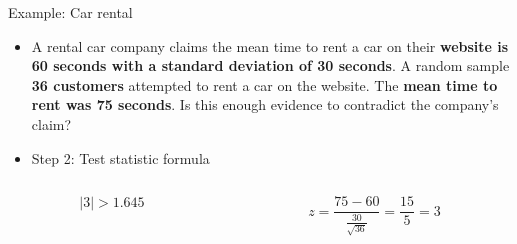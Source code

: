 \documentclass[
  ignorenonframetext,
]{beamer}
\begin{document}
\begin{frame}{Example: Car rental}
\label{example-car-rental-3}
\begin{itemize}
\item
  A rental car company claims the mean time to rent a car on their
  \textbf{website is 60 seconds with a standard deviation of 30
  seconds}. A random sample \textbf{36 customers} attempted to rent a
  car on the website. The \textbf{mean time to rent was 75 seconds}. Is
  this enough evidence to contradict the company's claim? \vspace{0.5cm}
\item
  Step 2: Test statistic formula \vspace{0.5cm}
\end{itemize}

\begin{columns}[T]
\begin{column}{0.5\textwidth}
\centering

\[
|3| > 1.645
\]\\
\end{column}

\begin{column}{0.5\textwidth}
\[
z = \frac{75 - 60}{\frac{30}{\sqrt{36}}} = \frac{15}{5} = 3
\]
\end{column}
\end{columns}
\end{frame}
\end{document}
